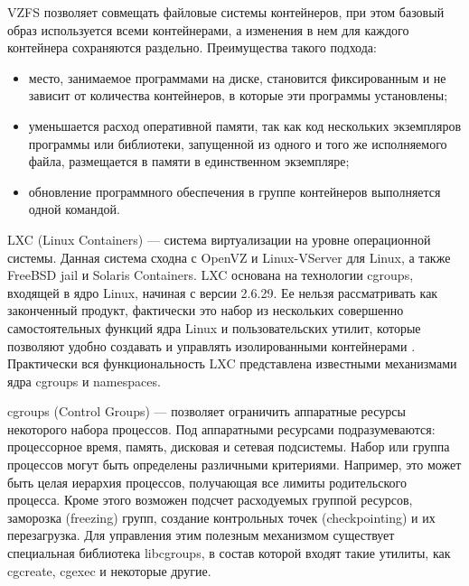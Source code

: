 VZFS позволяет совмещать файловые системы контейнеров, при этом базовый образ используется всеми контейнерами, а изменения в нем для каждого контейнера сохраняются раздельно.
Преимущества такого подхода:
\begin{itemize}
  \item место, занимаемое программами на диске, становится фиксированным и не зависит от количества контейнеров, в которые эти программы установлены;
  \item уменьшается расход оперативной памяти, так как код нескольких экземпляров программы или библиотеки, запущенной из одного и того же исполняемого файла, размещается в памяти в единственном экземпляре;
  \item обновление программного обеспечения в группе контейнеров выполняется одной командой.
\end{itemize}

LXC (Linux Containers) --- система виртуализации на уровне операционной системы.
Данная система сходна с OpenVZ и Linux-VServer для Linux, а также FreeBSD jail и Solaris Containers.
LXC основана на технологии cgroups, входящей в ядро Linux, начиная с версии 2.6.29.
Ее нельзя рассматривать как законченный продукт, фактически это набор из нескольких совершенно самостоятельных функций ядра Linux и пользовательских утилит, которые позволяют удобно создавать и управлять изолированными контейнерами \cite{lxc}.
Практически вся функциональность LXC представлена известными механизмами ядра cgroups и namespaces.

cgroups (Control Groups) --- позволяет ограничить аппаратные ресурсы некоторого набора процессов.
Под аппаратными ресурсами подразумеваются: процессорное время, память, дисковая и сетевая подсистемы.
Набор или группа процессов могут быть определены различными критериями.
Например, это может быть целая иерархия процессов, получающая все лимиты родительского процесса.
Кроме этого возможен подсчет расходуемых группой ресурсов, заморозка (freezing) групп, создание контрольных точек (checkpointing) и их перезагрузка.
Для управления этим полезным механизмом существует специальная библиотека libcgroups, в состав которой входят такие утилиты, как cgcreate, cgexec и некоторые другие.

